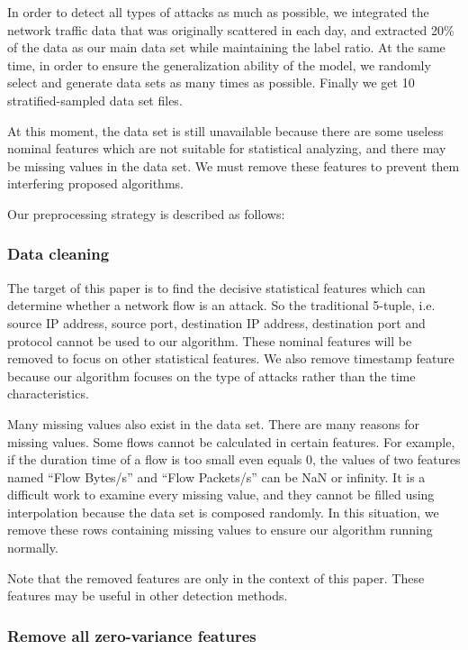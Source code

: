 \documentclass[journal]{IEEEtran}
\begin{document}
In order to detect all types of attacks as much as possible, we integrated the network traffic data that was originally scattered in each day, and extracted 20\% of the data as our main data set while maintaining the label ratio. At the same time, in order to ensure the generalization ability of the model, we randomly select and generate data sets as many times as possible. Finally we get 10 stratified-sampled data set files. 

At this moment, the data set is still unavailable because there are some useless nominal features which are not suitable for statistical analyzing, and there may be missing values in the data set. We must remove these features to prevent them interfering proposed algorithms.

Our preprocessing strategy is described as follows:

\subsubsection{Data cleaning}
The target of this paper is to find the decisive statistical features which can determine whether a network flow is an attack. 
So the traditional 5-tuple, i.e. source IP address, source port, destination IP address, destination port and protocol cannot be used to our algorithm. 
These nominal features will be removed to focus on other statistical features. 
We also remove timestamp feature because our algorithm focuses on the type of attacks rather than the time characteristics.

Many missing values also exist in the data set. There are many reasons for missing values. Some flows cannot be calculated in certain features. For example, if the duration time of a flow is too small even equals 0, the values of two features named ``Flow Bytes/s'' and ``Flow Packets/s'' can be NaN or infinity. It is a difficult work to examine every missing value, and they cannot be filled using interpolation because the data set is composed randomly. In this situation, we remove these rows containing missing values to ensure our algorithm running normally.

Note that the removed features are only in the context of this paper. These features may be useful in other detection methods.

\subsubsection{Remove all zero-variance features}
\end{document}
